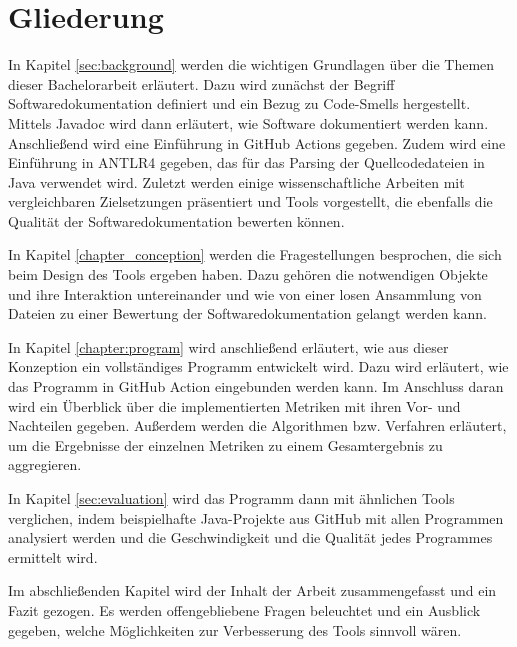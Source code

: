 \section{Gliederung}
In Kapitel \ref{sec:background} werden die wichtigen Grundlagen über die Themen dieser Bachelorarbeit erläutert. Dazu  wird zunächst der Begriff Softwaredokumentation definiert und ein Bezug zu Code-Smells hergestellt. Mittels Javadoc wird dann erläutert, wie Software dokumentiert werden kann. Anschließend wird eine Einführung in GitHub Actions gegeben.  Zudem wird eine Einführung in ANTLR4 gegeben, das für das Parsing der Quellcodedateien in Java verwendet wird. Zuletzt werden einige wissenschaftliche Arbeiten mit vergleichbaren Zielsetzungen präsentiert und Tools vorgestellt, die ebenfalls die Qualität der Softwaredokumentation bewerten können.

In Kapitel \ref{chapter_conception} werden die Fragestellungen besprochen, die sich beim Design des Tools ergeben haben. Dazu gehören die notwendigen Objekte und ihre Interaktion untereinander und wie von einer losen Ansammlung von Dateien zu einer Bewertung der Softwaredokumentation gelangt werden kann.

In Kapitel \ref{chapter:program} wird anschließend erläutert, wie aus dieser Konzeption ein vollständiges Programm entwickelt wird. Dazu wird erläutert, wie das Programm in GitHub Action eingebunden werden kann. Im Anschluss daran wird ein Überblick über die implementierten Metriken mit ihren Vor- und Nachteilen gegeben. Außerdem werden die Algorithmen bzw. Verfahren erläutert, um die Ergebnisse der einzelnen Metriken zu einem Gesamtergebnis zu aggregieren. 

In Kapitel \ref{sec:evaluation} wird das Programm dann mit ähnlichen Tools verglichen, indem beispielhafte Java-Projekte aus GitHub mit allen Programmen analysiert werden und die Geschwindigkeit und die Qualität jedes Programmes ermittelt wird. 

Im abschließenden Kapitel wird der Inhalt der Arbeit zusammengefasst und ein Fazit gezogen. Es werden offengebliebene Fragen beleuchtet und ein Ausblick gegeben, welche Möglichkeiten zur Verbesserung des Tools sinnvoll wären. 
